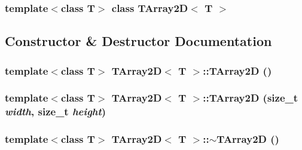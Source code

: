 \subsubsection*{template$<$class T$>$ class TArray2D$<$ T $>$}



\subsection{Constructor \& Destructor Documentation}
\hypertarget{classTArray2D_a5328f64d2dcc8fc754f03c2d5f3f2609}{
\subsubsection[{TArray2D}]{\setlength{\rightskip}{0pt plus 5cm}template$<$class T$>$ {\bf TArray2D}$<$ T $>$::{\bf TArray2D} ()}}
\label{classTArray2D_a5328f64d2dcc8fc754f03c2d5f3f2609}
\hypertarget{classTArray2D_a0bc191a85733601b9850898f521e9bb9}{
\subsubsection[{TArray2D}]{\setlength{\rightskip}{0pt plus 5cm}template$<$class T$>$ {\bf TArray2D}$<$ T $>$::{\bf TArray2D} (size\_\-t {\em width}, \/  size\_\-t {\em height})}}
\label{classTArray2D_a0bc191a85733601b9850898f521e9bb9}
\hypertarget{classTArray2D_ad42133d15fccad77acb8e73c79c94733}{
\subsubsection[{$\sim$TArray2D}]{\setlength{\rightskip}{0pt plus 5cm}template$<$class T$>$ {\bf TArray2D}$<$ T $>$::$\sim${\bf TArray2D} ()}}
\label{classTArray2D_ad42133d15fccad77acb8e73c79c94733}


